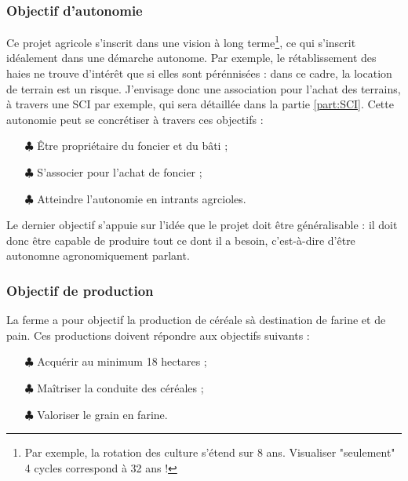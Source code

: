 \documentclass{book}
\begin{document}
\subsubsection{Objectif d'autonomie}

Ce projet agricole s'inscrit dans une vision à long terme\footnote{Par exemple, la rotation des culture s'étend sur 8 ans. Visualiser "seulement" 4 cycles correspond à 32 ans !}, ce qui s'inscrit idéalement dans une démarche autonome. Par exemple, le rétablissement des haies ne trouve d'intérêt que si elles sont pérénnisées : dans ce cadre, la location de terrain est un risque. J'envisage donc une association pour l'achat des terrains, à travers une SCI par exemple, qui sera détaillée dans la partie \ref{part:SCI}. Cette autonomie peut se concrétiser à travers ces objectifs :

\hspace{1cm}
\begin{itemize}

	\item[$\clubsuit$] Être propriétaire du foncier et du bâti ; 
	\item[$\clubsuit$] S'associer pour l'achat de foncier ;
	\item[$\clubsuit$] Atteindre l'autonomie en intrants agrcioles.

\end{itemize}
\hspace{1cm}

Le dernier objectif s'appuie sur l'idée que le projet doit être généralisable : il doit donc être capable de produire tout ce dont il a besoin, c'est-à-dire d'être autonomne agronomiquement parlant.

\subsubsection{Objectif de production}

La ferme a pour objectif la production de céréale sà destination de farine et de pain. Ces productions doivent répondre aux objectifs suivants :

\begin{itemize}

	\item[$\clubsuit$] Acquérir au minimum 18 hectares ;
	\item[$\clubsuit$] Maîtriser la conduite des céréales ;
	\item[$\clubsuit$] Valoriser le grain en farine.

\end{itemize}
\hspace{1cm}
\end{document}
